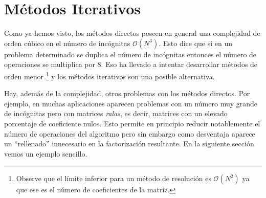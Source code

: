 \chapter{Métodos Iterativos}
Como ya hemos visto, los métodos directos poseen en general una complejidad de orden cúbico en el número de incógnitas $\mathcal{O}(N^3)$. Esto dice que si en un problema determinado se duplica el número de incógnitas entonces el número de operaciones se multiplica por 8. Eso ha llevado a intentar desarrollar métodos de orden menor \footnote{Observe que el límite inferior para un método de resolución  es $\mathcal{O}(N^2)$ ya que ese es el número de coeficientes de la matriz.} y los métodos iterativos son una posible alternativa.

Hay, además de la complejidad,  otros problemas con los métodos directos. Por ejemplo, en muchas aplicaciones aparecen problemas con un número muy grande de incógnitas pero con matrices \emph{ralas}, es decir, matrices con un elevado porcentaje de coeficiente nulos. Esto permite en principio reducir notablemente el número de operaciones del algoritmo pero sin embargo como desventaja aparece un ``rellenado'' innecesario en la factorización resultante. En la siguiente sección vemos un ejemplo sencillo.

